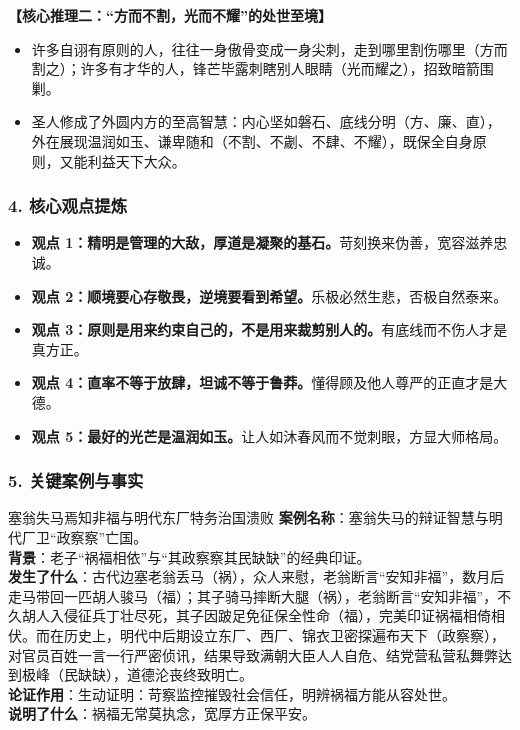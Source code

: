 \noindent\textbf{【核心推理二：“方而不割，光而不耀”的处世至境】}
\begin{itemize}
    \item 许多自诩有原则的人，往往一身傲骨变成一身尖刺，走到哪里割伤哪里（方而割之）；许多有才华的人，锋芒毕露刺瞎别人眼睛（光而耀之），招致暗箭围剿。
    \item 圣人修成了外圆内方的至高智慧：内心坚如磐石、底线分明（方、廉、直），外在展现温润如玉、谦卑随和（不割、不劌、不肆、不耀），既保全自身原则，又能利益天下大众。
\end{itemize}

\subsubsection{4. 核心观点提炼}
\begin{itemize}
    \item \textbf{观点 1：精明是管理的大敌，厚道是凝聚的基石。}苛刻换来伪善，宽容滋养忠诚。
    \item \textbf{观点 2：顺境要心存敬畏，逆境要看到希望。}乐极必然生悲，否极自然泰来。
    \item \textbf{观点 3：原则是用来约束自己的，不是用来裁剪别人的。}有底线而不伤人才是真方正。
    \item \textbf{观点 4：直率不等于放肆，坦诚不等于鲁莽。}懂得顾及他人尊严的正直才是大德。
    \item \textbf{观点 5：最好的光芒是温润如玉。}让人如沐春风而不觉刺眼，方显大师格局。
\end{itemize}

\subsubsection{5. 关键案例与事实}
\begin{CaseBox}{塞翁失马焉知非福与明代东厂特务治国溃败}
\textbf{案例名称}：塞翁失马的辩证智慧与明代厂卫“政察察”亡国。\\
\textbf{背景}：老子“祸福相依”与“其政察察其民缺缺”的经典印证。\\
\textbf{发生了什么}：古代边塞老翁丢马（祸），众人来慰，老翁断言“安知非福”，数月后走马带回一匹胡人骏马（福）；其子骑马摔断大腿（祸），老翁断言“安知非福”，不久胡人入侵征兵丁壮尽死，其子因跛足免征保全性命（福），完美印证祸福相倚相伏。而在历史上，明代中后期设立东厂、西厂、锦衣卫密探遍布天下（政察察），对官员百姓一言一行严密侦讯，结果导致满朝大臣人人自危、结党营私营私舞弊达到极峰（民缺缺），道德沦丧终致明亡。\\
\textbf{论证作用}：生动证明：苛察监控摧毁社会信任，明辨祸福方能从容处世。\\
\textbf{说明了什么}：祸福无常莫执念，宽厚方正保平安。
\end{CaseBox}

